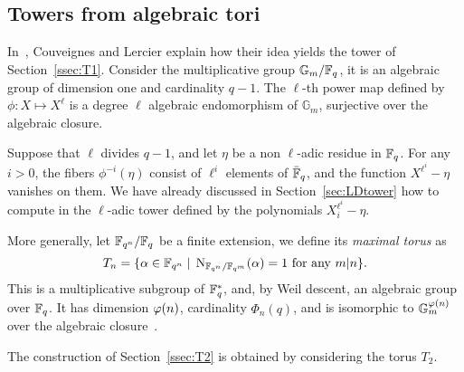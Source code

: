 \documentclass{sig-alternate}
\begin{document}
\subsection{Towers from algebraic tori}

In~\cite{couveignes+lercier11}, Couveignes and Lercier explain how
their idea yields the tower of Section~\ref{ssec:T1}. Consider the
multiplicative group $\mathbb{G}_m/\mathbb{F}_q$, it is an algebraic group of
dimension one and cardinality $q-1$.  The $\ell$-th power map defined
by $\phi:X\mapsto X^\ell$ is a degree $\ell$ algebraic endomorphism of
$\mathbb{G}_m$, surjective over the algebraic closure.

Suppose that $\ell$ divides $q-1$, and let $\eta$ be a non $\ell$-adic
residue in $\mathbb{F}_q$. For any $i>0$, the fibers $\phi^{-i}(\eta)$ consist
of $\ell^i$ elements of $\bar{\mathbb{F}}_q$, and the function
$X^{\ell^i}-\eta$ vanishes on them. We have already discussed in
Section~\ref{sec:LDtower} how to compute in the $\ell$-adic tower
defined by the polynomials $X_i^{\ell^i}-\eta$.

More generally, let $\mathbb{F}_{q^n}/\mathbb{F}_q$ be a finite extension, we define
its \emph{maximal torus} as
\begin{equation}
  \label{eq:Tn}
  T_n = \{\alpha\in\mathbb{F}_{q^n} \;|\; \operatorname{N}_{\mathbb{F}_{q^n}/\mathbb{F}_{q^m}}(\alpha) = 1 
  \text{ for any $m|n$} \}.
\end{equation}
This is a multiplicative subgroup of $\mathbb{F}_q^\ast$, and, by Weil
descent, an algebraic group over $\mathbb{F}_q$. It has dimension $\varphi(n)$,
cardinality $\Phi_n(q)$, and is isomorphic to
$\mathbb{G}_m^{\varphi(n)}$ over the algebraic
closure~\cite{rubin-silverberg+crypto03,rubin+silverberg03,voskresenskii98}.

The construction of Section~\ref{ssec:T2} is obtained by considering
the torus $T_2$.
\end{document}
